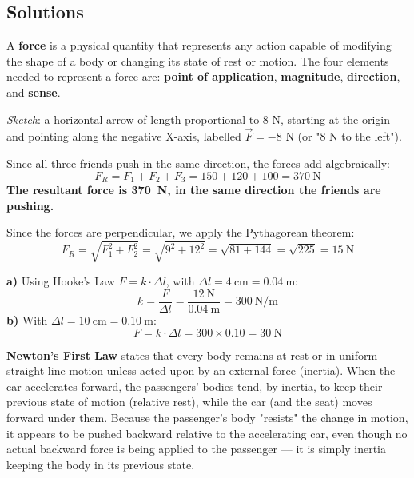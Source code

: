 \documentclass[11pt,a4paper]{article}
\begin{document}
\subsection*{Solutions}

\begin{solucioneng}
A \textbf{force} is a physical quantity that represents any action capable of modifying the shape of a body or changing its state of rest or motion. The four elements needed to represent a force are: \textbf{point of application}, \textbf{magnitude}, \textbf{direction}, and \textbf{sense}.

\textit{Sketch}: a horizontal arrow of length proportional to 8 N, starting at the origin and pointing along the negative X-axis, labelled $\vec{F} = -8$ N (or "8 N to the left").
\end{solucioneng}

\begin{solucioneng}
Since all three friends push in the same direction, the forces add algebraically:
\[
F_R = F_1 + F_2 + F_3 = 150 + 120 + 100 = \qty{370}{\newton}
\]
\textbf{The resultant force is \qty{370}{\newton}, in the same direction the friends are pushing.}
\end{solucioneng}

\begin{solucioneng}
Since the forces are perpendicular, we apply the Pythagorean theorem:
\[
F_R = \sqrt{F_1^2 + F_2^2} = \sqrt{9^2 + 12^2} = \sqrt{81+144} = \sqrt{225} = \qty{15}{\newton}
\]
\end{solucioneng}

\begin{solucioneng}
\textbf{a)} Using Hooke's Law $F = k \cdot \Delta l$, with $\Delta l = \qty{4}{\centi\metre} = \qty{0.04}{\m}$:
\[
k = \dfrac{F}{\Delta l} = \dfrac{12\ \unit{\newton}}{0.04\ \unit{\m}} = \qty{300}{\newton\per\metre}
\]
\textbf{b)} With $\Delta l = \qty{10}{\centi\metre} = \qty{0.10}{\m}$:
\[
F = k \cdot \Delta l = 300 \times 0.10 = \qty{30}{\newton}
\]
\end{solucioneng}

\begin{solucioneng}
\textbf{Newton's First Law} states that every body remains at rest or in uniform straight-line motion unless acted upon by an external force (inertia). When the car accelerates forward, the passengers' bodies tend, by inertia, to keep their previous state of motion (relative rest), while the car (and the seat) moves forward under them. Because the passenger's body "resists" the change in motion, it appears to be pushed backward relative to the accelerating car, even though no actual backward force is being applied to the passenger --- it is simply inertia keeping the body in its previous state.
\end{solucioneng}
\end{document}
